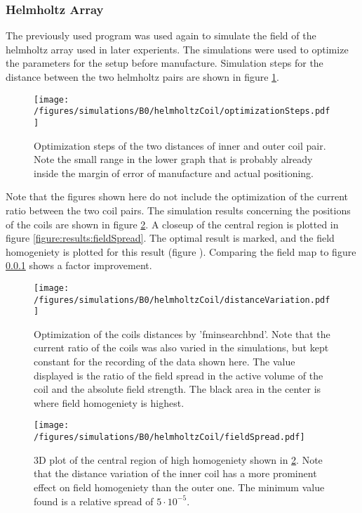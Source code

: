         \subsubsection{Helmholtz Array}
        The previously used program was used again to simulate the field of the helmholtz array used in later experients. The simulations were used to optimize the parameters for the setup before manufacture. Simulation steps for the distance between the two helmholtz pairs are shown in figure \ref{fig:results:optimizationSteps}.
        \begin{figure}
            \centering
            \texttt{[image: /figures/simulations/B0/helmholtzCoil/optimizationSteps.pdf]}
            \caption[Helmholtz coil optimization]{Optimization steps of the two distances of inner and outer coil pair. Note the small range in the lower graph that is probably already inside the margin of error of manufacture and actual positioning.}
            \label{fig:results:optimizationSteps}
        \end{figure}
        Note that the figures shown here do not include the optimization of the current ratio between the two coil pairs. The simulation results concerning the positions of the coils are shown in figure \ref{fig:results:distanceVariation}. A closeup of the central region is plotted in figure \ref{figure:results:fieldSpread}. The optimal result is marked, and the field homogeniety is plotted for this result (figure ). Comparing the field map to figure \ref{} shows a factor  improvement.
        \begin{figure}
           \centering
           \texttt{[image: /figures/simulations/B0/helmholtzCoil/distanceVariation.pdf]}
           \label{fig:results:distanceVariation}
           \caption[Optimization steps]{Optimization of the coils distances by 'fminsearchbnd'. Note that the current ratio of the coils was also varied in the simulations, but kept constant for the recording of the data shown here. The value displayed is the ratio of the field spread in the active volume of the coil and the absolute field strength. The black area in the center is where field homogeniety is highest.}
        \end{figure}
        \begin{figure}
            \texttt{[image: /figures/simulations/B0/helmholtzCoil/fieldSpread.pdf]}
            \label{fig:results:fieldSpread}
            \caption{3D plot of the central region of high homogeniety shown in \ref{fig:results:distanceVariation}. Note that the distance variation of the inner coil has a more prominent effect on field homogeniety than the outer one. The minimum value found is a relative spread of $5\cdot 10^{-5}$.}
        \end{figure}
